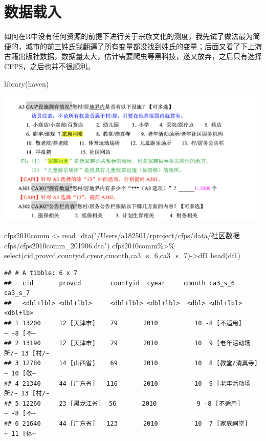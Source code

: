 \documentclass[
  oneside]{book}
\newenvironment{Shaded}{\begin{snugshade}}{\end{snugshade}}
\newcommand{\FunctionTok}[1]{\textcolor[rgb]{0.00,0.00,0.00}{#1}}
\newcommand{\NormalTok}[1]{#1}
\newcommand{\OtherTok}[1]{\textcolor[rgb]{0.56,0.35,0.01}{#1}}
\newcommand{\SpecialCharTok}[1]{\textcolor[rgb]{0.00,0.00,0.00}{#1}}
\newcommand{\StringTok}[1]{\textcolor[rgb]{0.31,0.60,0.02}{#1}}
\begin{document}
\hypertarget{ux6570ux636eux8f7dux5165}{%
\section{数据载入}\label{ux6570ux636eux8f7dux5165}}

如何在R中没有任何资源的前提下进行关于宗族文化的测度，我先试了做法最为简便的，城市的前三姓氏我翻遍了所有变量都没找到姓氏的变量；后面又看了下上海古籍出版社数据，数据量太大，估计需要爬虫等黑科技，遂又放弃，之后只有选择CFPS，之后也并不很顺利。

\begin{Shaded}
\begin{Highlighting}[]
\FunctionTok{library}\NormalTok{(haven)}
\end{Highlighting}
\end{Shaded}

\includegraphics{image/q1.png}

\begin{Shaded}
\begin{Highlighting}[]
\NormalTok{cfps2010comm }\OtherTok{\textless{}{-}} \FunctionTok{read\_dta}\NormalTok{(}\StringTok{"/Users/a182501/rproject/cfps/data/社区数据cfps/cfps2010comm\_201906.dta"}\NormalTok{)}
\NormalTok{cfps2010comm}\SpecialCharTok{\%\textgreater{}\%}
  \FunctionTok{select}\NormalTok{(cid,provcd,countyid,cyear,cmonth,ca3\_s\_6,ca3\_s\_7)}\OtherTok{{-}\textgreater{}}\NormalTok{df1}
\FunctionTok{head}\NormalTok{(df1)}
\end{Highlighting}
\end{Shaded}

\begin{verbatim}
## # A tibble: 6 x 7
##   cid       provcd        countyid  cyear     cmonth ca3_s_6            ca3_s_7 
##   <dbl+lbl> <dbl+lbl>     <dbl+lbl> <dbl+lbl>  <dbl> <dbl+lbl>          <dbl+lb>
## 1 13200     12 [天津市]    79       2010          10 -8 [不适用]      ~ -8 [不~
## 2 13190     12 [天津市]    79       2010          10  9 [老年活动场所/~ 13 [村/~
## 3 12780     14 [山西省]    69       2010          10  8 [教堂/清真寺] ~ 10 [敬~
## 4 21340     44 [广东省]   116       2010          10  9 [老年活动场所/~ 13 [村/~
## 5 12260     23 [黑龙江省]  56       2010           9 -8 [不适用]      ~ -8 [不~
## 6 21640     44 [广东省]   123       2010          10  7 [家族祠堂]    ~ 11 [体~
\end{verbatim}
\end{document}
